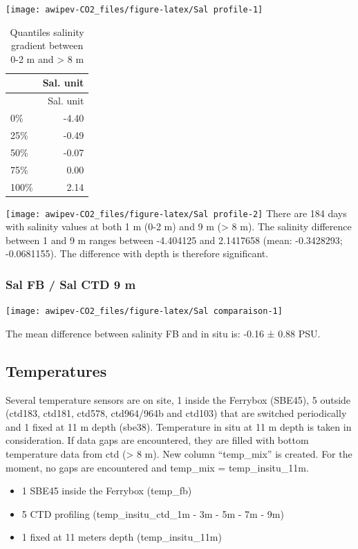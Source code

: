 \documentclass[
]{article}
\providecommand{\tightlist}{%
  \setlength{\itemsep}{0pt}\setlength{\parskip}{0pt}}
\begin{document}
\begin{center}\texttt{[image: awipev-CO2\_files/figure-latex/Sal profile-1]} \end{center}

\begin{longtable}[]{@{}lr@{}}
\caption{Quantiles salinity gradient between 0-2 m and \textgreater{} 8
m}\tabularnewline
\toprule
& Sal. unit\tabularnewline
\midrule
\endfirsthead
\toprule
& Sal. unit\tabularnewline
\midrule
\endhead
0\% & -4.40\tabularnewline
25\% & -0.49\tabularnewline
50\% & -0.07\tabularnewline
75\% & 0.00\tabularnewline
100\% & 2.14\tabularnewline
\bottomrule
\end{longtable}

\texttt{[image: awipev-CO2\_files/figure-latex/Sal profile-2]}
There are 184 days with salinity values at both 1 m (0-2 m) and 9 m
(\textgreater{} 8 m). The salinity difference between 1 and 9 m ranges
between -4.404125 and 2.1417658 (mean: -0.3428293; -0.0681155). The
difference with depth is therefore significant.

\hypertarget{sal-fb-sal-ctd-9-m}{%
\subsubsection{\texorpdfstring{\textbf{Sal FB / Sal CTD 9 m
}}{Sal FB / Sal CTD 9 m }}\label{sal-fb-sal-ctd-9-m}}

\begin{center}\texttt{[image: awipev-CO2\_files/figure-latex/Sal comparaison-1]} \end{center}

The mean difference between salinity FB and in situ is: -0.16 ± 0.88
PSU.

\hypertarget{temperatures}{%
\subsection{Temperatures}\label{temperatures}}

Several temperature sensors are on site, 1 inside the Ferrybox (SBE45),
5 outside (ctd183, ctd181, ctd578, ctd964/964b and ctd103) that are
switched periodically and 1 fixed at 11 m depth (sbe38). Temperature in
situ at 11 m depth is taken in consideration. If data gaps are
encountered, they are filled with bottom temperature data from ctd
(\textgreater{} 8 m). New column ``temp\_mix'' is created. For the
moment, no gaps are encountered and temp\_mix = temp\_insitu\_11m.

\begin{itemize}
\tightlist
\item
  1 SBE45 inside the Ferrybox (temp\_fb)
\item
  5 CTD profiling (temp\_insitu\_ctd\_1m - 3m - 5m - 7m - 9m)
\item
  1 fixed at 11 meters depth (temp\_insitu\_11m)
\end{itemize}
\end{document}

